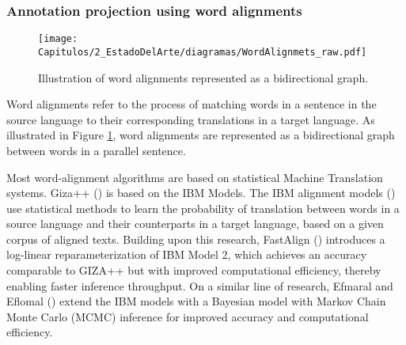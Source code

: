 \subsubsection{Annotation projection using word alignments}
\label{ch:2_word_alignments}

\begin{figure}
    \centering
    \texttt{[image: Capitulos/2\_EstadoDelArte/diagramas/WordAlignmets\_raw.pdf]}
    \caption{Illustration of word alignments represented as a bidirectional graph.}
    \label{fig:chap3_wordalignmentsraw}
\end{figure}

Word alignments refer to the process of matching words in a sentence in the source language to their corresponding translations in a target language. As illustrated in Figure \ref{fig:chap3_wordalignmentsraw}, word alignments are represented as a bidirectional graph between words in a parallel sentence. 



Most word-alignment algorithms are based on statistical Machine Translation systems. Giza++ (\cite{och-ney-2003-systematic-giza}) is based on the IBM Models. The IBM alignment models (\cite{brown-etal-1993-mathematics}) use statistical methods to learn the probability of translation between words in a source language and their counterparts in a target language, based on a given corpus of aligned texts. Building upon this research, FastAlign (\cite{dyer-etal-2013-simple}) introduces a log-linear reparameterization of IBM Model 2, which achieves an accuracy comparable to GIZA++ but with improved computational efficiency, thereby enabling faster inference throughput. On a similar line of research, Efmaral and Eflomal (\cite{Ostling2016efmaral}) extend the IBM models with a Bayesian model with Markov Chain Monte Carlo (MCMC) inference for improved accuracy and computational efficiency. 


